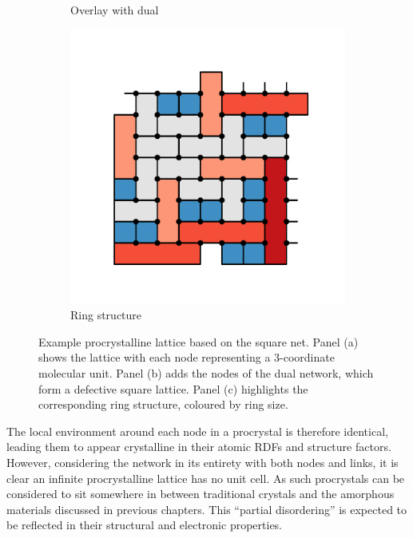 \begin{figure}[bt]
\begin{subfigure}[b]{0.3\textwidth}
         \caption{Overlay with dual}
         \label{fig:prointrob}
     \end{subfigure}
     \hfill
     \begin{subfigure}[b]{0.3\textwidth}
         \centering
         \includegraphics[width=\textwidth]{./figures/procrystals/pro_intro2.pdf}
         \caption{Ring structure}
         \label{fig:prointroc}
     \end{subfigure}
     
     \caption{Example procrystalline lattice based on the square net. Panel (a) shows the lattice with each node representing a 3\--coordinate molecular unit. Panel (b) adds the nodes of the dual network, which form a defective square lattice. Panel (c) highlights the corresponding ring structure, coloured by ring size.}
     \label{fig:nprointro}
\end{figure}

The local environment around each node in a procrystal is therefore identical, leading them to appear crystalline in their atomic RDFs and structure factors. 
However, considering the network in its entirety with both nodes and links, it is clear an infinite procrystalline lattice has no unit cell.
As such procrystals can be considered to sit somewhere in between traditional crystals and the amorphous materials discussed in previous chapters.
This ``partial disordering'' is expected to be reflected in their structural and electronic properties.

